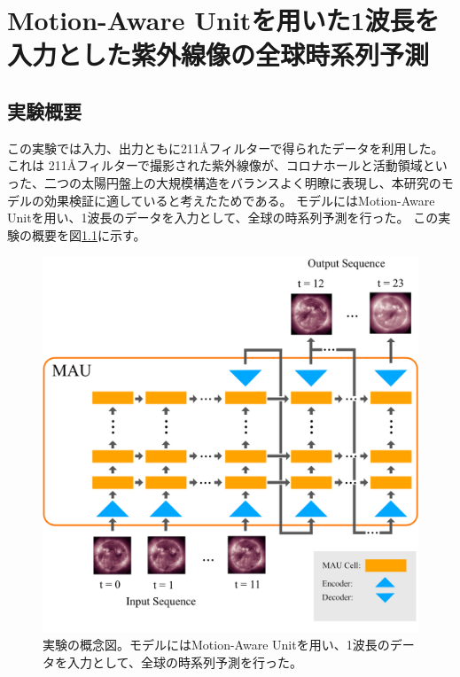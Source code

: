 \chapter{Motion-Aware Unitを用いた1波長を入力とした紫外線像の全球時系列予測}
  \section{実験概要}
  この実験では入力、出力ともに211Åフィルターで得られたデータを利用した。
  これは 211Åフィルターで撮影された紫外線像が、コロナホールと活動領域といった、二つの太陽円盤上の大規模構造をバランスよく明瞭に表現し、本研究のモデルの効果検証に適していると考えたためである。
  モデルにはMotion-Aware Unitを用い、1波長のデータを入力として、全球の時系列予測を行った。
  この実験の概要を図\ref{fig:exp1_overview}に示す。

  \begin{figure}[htbp]
    \centering
    \includegraphics[width=\textwidth]{figures/exp1/exp1_concept.jpg}
    \caption{実験の概念図。モデルにはMotion-Aware Unitを用い、1波長のデータを入力として、全球の時系列予測を行った。}
    \label{fig:exp1_overview}
  \end{figure}


